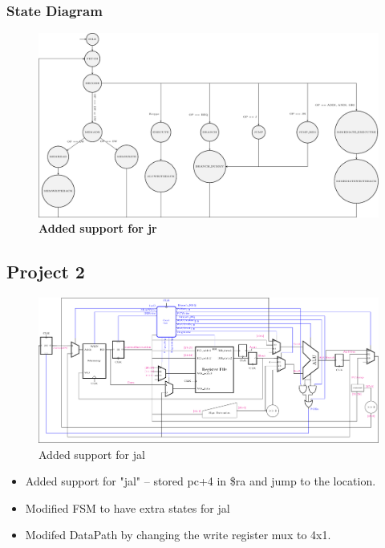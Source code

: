 \documentclass{article}
\begin{document}
\subsubsection*{State Diagram}
\begin{figure}[H]
    \begin{center}
        \includegraphics[scale=0.7]{MultiCycleImplementation_NewOnes2/TexFiles/SD1.pdf}
        \caption*{\textbf{Added support for jr}}
    \end{center}
\end{figure}


\subsection*{Project 2}
\begin{figure}[H]
    \begin{center}
        \includegraphics[scale=0.7]{MultiCycleImplementation_NewOnes2/TexFiles/MultiCycle_NewOnes2.pdf}
        \caption*{Added support for jal}
    \end{center}
\end{figure}
\begin{itemize}
    \item Added support for "jal" -- stored pc+4 in \$ra and jump to the location.
    \item Modified FSM to have extra states for jal
    \item Modifed DataPath by changing the write register mux to 4x1.
\end{itemize}
\end{document}
